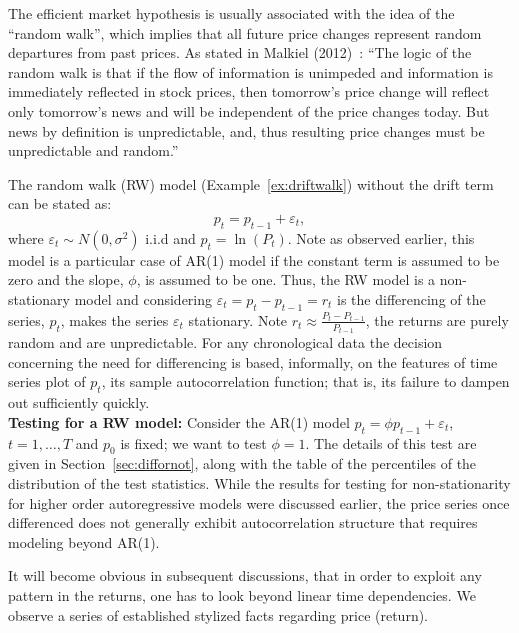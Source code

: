 The efficient market hypothesis is usually associated with the idea of the ``random walk'', which implies that all future price changes represent random departures from past prices. As stated in Malkiel (2012)~\cite{malkiel}: ``The logic of the random walk is that if the flow of information is unimpeded and information is immediately reflected in stock prices, then tomorrow's price change will reflect only tomorrow's news and will be independent of the price changes today. But news by definition is unpredictable, and, thus resulting price changes must be unpredictable and random.''


The random walk (RW) model (Example~\ref{ex:driftwalk}) without the drift term can be stated as:
	\begin{equation} \label{eqn:2pteq}
	p_t = p_{t-1} + \varepsilon_t,
	\end{equation}
where $\varepsilon_t \sim N(0,\sigma^2)$ i.i.d and $p_t = \ln{(P_t)}$. Note as observed earlier, this model is a particular case of AR(1) model if the constant term is assumed to be zero and the slope, $\phi$, is assumed to be one. Thus, the RW model is a non-stationary model and considering $\varepsilon_t = p_t - p_{t-1}=r_t$ is the differencing of the series, $p_t$, makes the series $\varepsilon_t$ stationary. Note $r_t \approx \frac{P_t - P_{t-1}}{P_{t-1}}$,  the returns are purely random and are unpredictable. For any chronological data the decision concerning the need for differencing is based, informally, on the features of time series plot of $p_t$, its sample autocorrelation function; that is, its failure to dampen out sufficiently quickly. \\


\noindent\textbf{Testing for a RW model:} Consider the AR(1) model $p_t = \phi p_{t-1} + \varepsilon_t$, $t = 1,\ldots,T$ and $p_0$ is fixed; we want to test $\phi = 1$. The details of this test are given in Section~\ref{sec:diffornot}, along with the table of the percentiles of the distribution of the test statistics. While the results for testing for non-stationarity for higher order autoregressive models were discussed earlier, the price series once differenced does not generally exhibit autocorrelation structure that requires modeling beyond AR(1).


It will become obvious in subsequent discussions, that in order to exploit any pattern in the returns, one has to look beyond linear time dependencies. We observe a series of established stylized facts regarding price (return). \\


